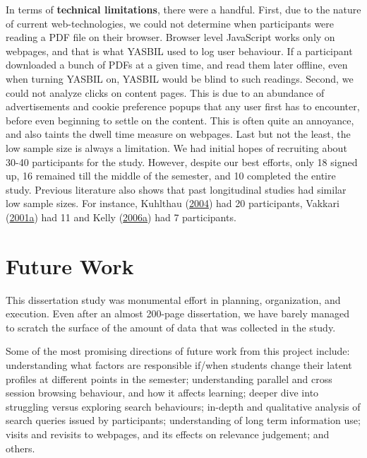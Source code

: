 \documentclass[letterpaper, nobind]{templates/ociamthesis}
\begin{document}
In terms of \textbf{technical limitations}, there were a handful.
First, due to the nature of current web-technologies, we could not determine when participants were reading a PDF file on their browser.
Browser level JavaScript works only on webpages, and that is what YASBIL used to log user behaviour.
If a participant downloaded a bunch of PDFs at a given time, and read them later offline, even when turning YASBIL on, YASBIL would be blind to such readings.
Second, we could not analyze clicks on content pages. This is due to an abundance of advertisements and cookie preference popups that any user first has to encounter, before even beginning to settle on the content. This is often quite an annoyance, and also taints the dwell time measure on webpages.
Last but not the least, the low sample size is always a limitation.
We had initial hopes of recruiting about 30-40 participants for the study.
However, despite our best efforts, only 18 signed up, 16 remained till the middle of the semester, and 10 completed the entire study.
Previous literature also shows that past longitudinal studies had similar low sample sizes.
For instance, Kuhlthau (\protect\hyperlink{ref-kuhlthau2004seeking}{2004}) had 20 participants, Vakkari (\protect\hyperlink{ref-vakkari2001changes}{2001a}) had 11 and Kelly (\protect\hyperlink{ref-kelly2006measuringa}{2006a}) had 7 participants.

\hypertarget{future-work}{%
\section{Future Work}\label{future-work}}

This dissertation study was monumental effort in planning, organization, and execution.
Even after an almost 200-page dissertation, we have barely managed to scratch the surface of the amount of data that was collected in the study.

Some of the most promising directions of future work from this project include:
understanding what factors are responsible if/when students change their latent profiles at different points in the semester;
understanding parallel and cross session browsing behaviour, and how it affects learning;
deeper dive into struggling versus exploring search behaviours;
in-depth and qualitative analysis of search queries issued by participants;
understanding of long term information use;
visits and revisits to webpages, and its effects on relevance judgement;
and others.
\end{document}
